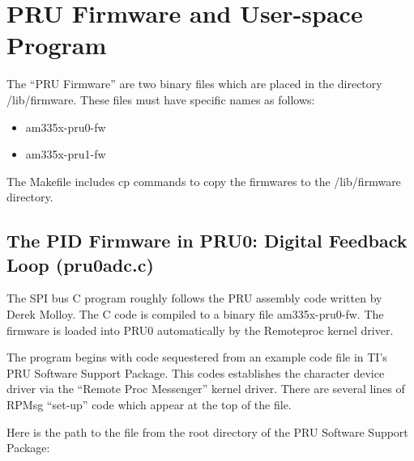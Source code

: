%
%
%

\chapter{PRU Firmware and User-space Program}

The ``PRU Firmware'' are two binary files which are placed in the directory /lib/firmware.
These files must have specific names as follows:

\begin{itemize}
	\item am335x-pru0-fw
	\item am335x-pru1-fw
\end{itemize}

The Makefile includes cp commands to copy the firmwares to the /lib/firmware directory.

\section{The PID Firmware in PRU0:  Digital Feedback Loop (pru0adc.c)}

The SPI bus C program roughly follows the PRU assembly code written by Derek Molloy.  The C code is compiled to a binary file am335x-pru0-fw. The firmware is loaded into PRU0 automatically by the Remoteproc kernel driver.

The program begins with code sequestered from an example code file in TI's PRU Software
Support Package.  This codes establishes the character device driver via the ``Remote Proc Messenger''
kernel driver.  There are several lines of RPMsg ``set-up'' code which appear at the top of the file.

Here is the path to the file from the root directory of the PRU Software Support Package:

